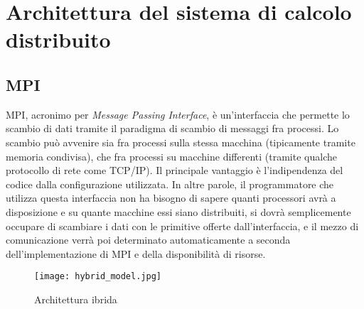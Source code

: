 \section{Architettura del sistema di calcolo distribuito}
\label{sec:architettura}

\subsection{MPI}
\label{subsec:mpi}

MPI, acronimo per \emph{Message Passing Interface}, è un'interfaccia che permette lo scambio di dati tramite il paradigma di scambio di messaggi fra processi. 
Lo scambio può avvenire sia fra processi sulla stessa macchina (tipicamente tramite memoria condivisa), che fra processi su macchine differenti (tramite qualche protocollo di rete come TCP/IP).
Il principale vantaggio è l'indipendenza del codice dalla configurazione utilizzata. In altre parole, il programmatore che utilizza questa interfaccia non ha bisogno di sapere quanti processori avrà a disposizione e su quante macchine essi siano distribuiti, si dovrà semplicemente occupare di scambiare i dati con le primitive offerte dall'interfaccia, e il mezzo di comunicazione verrà poi determinato automaticamente a seconda dell'implementazione di MPI e della disponibilità di risorse.

\begin{figure}[p]
\centering
\texttt{[image: hybrid\_model.jpg]}
\caption{Architettura ibrida}
\end{figure}

